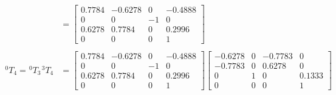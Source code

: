 \begin{equation*}
\begin{split}
                                                                  & =\begin{bmatrix}
                                                                         0.7784 & -0.6278 & 0  & -0.4888 \\
                                                                         0      & 0       & -1 & 0       \\
                                                                         0.6278 & 0.7784  & 0  & 0.2996  \\
                                                                         0      & 0       & 0  & 1
                                                                     \end{bmatrix}                                  \\                                      \\
        ^{0}T_{4} = \hspace{1pt} ^{0}T_{3} \hspace{1pt} ^{3}T_{4} & =\begin{bmatrix}
                                                                         0.7784 & -0.6278 & 0  & -0.4888 \\
                                                                         0      & 0       & -1 & 0       \\
                                                                         0.6278 & 0.7784  & 0  & 0.2996  \\
                                                                         0      & 0       & 0  & 1
                                                                     \end{bmatrix}\begin{bmatrix}
                                                                                      -0.6278 & 0 & -0.7783 & 0      \\
                                                                                      -0.7783 & 0 & 0.6278  & 0      \\
                                                                                      0       & 1 & 0       & 0.1333 \\
                                                                                      0       & 0 & 0       & 1
                                                                                  \end{bmatrix}                      \\

\end{split}
\end{equation*}
